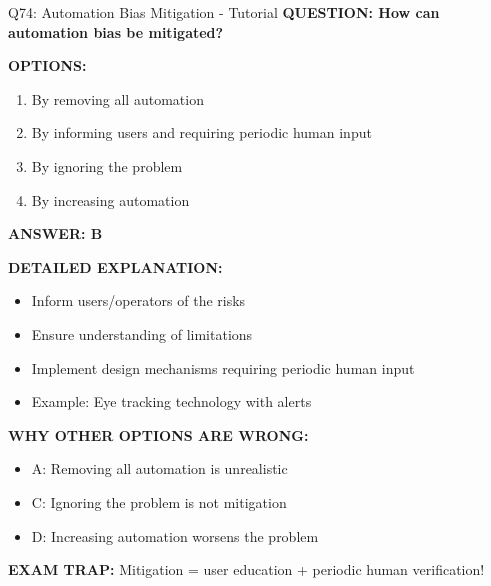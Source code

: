 \documentclass[8pt]{beamer}
\begin{document}
	\begin{frame}{Q74: Automation Bias Mitigation - Tutorial}
		\fontsize{6.5}{7.5}\selectfont
		\textbf{QUESTION: How can automation bias be mitigated?}
		
		\vspace{0.1cm}
		\textbf{OPTIONS:}
		\begin{enumerate}
			\item By removing all automation
			\item By informing users and requiring periodic human input
			\item By ignoring the problem
			\item By increasing automation
		\end{enumerate}
		
		\vspace{0.1cm}
		\textcolor{myblue}{\textbf{ANSWER: B}}
		
		\vspace{0.1cm}
		\textbf{DETAILED EXPLANATION:}
		\begin{itemize}
			\item Inform users/operators of the risks
			\item Ensure understanding of limitations
			\item Implement design mechanisms requiring periodic human input
			\item Example: Eye tracking technology with alerts
		\end{itemize}
		
		\vspace{0.1cm}
		\textcolor{myred}{\textbf{WHY OTHER OPTIONS ARE WRONG:}}
		\begin{itemize}
			\item \textcolor{myred}{A:} Removing all automation is unrealistic
			\item \textcolor{myred}{C:} Ignoring the problem is not mitigation
			\item \textcolor{myred}{D:} Increasing automation worsens the problem
		\end{itemize}
		
		\textcolor{myred}{\textbf{EXAM TRAP:}} Mitigation = \textcolor{myblue}{user education + periodic human verification}!
	\end{frame}
	
\end{document}

